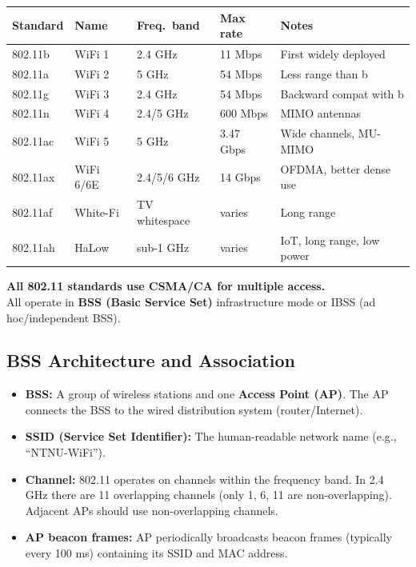 \begin{keybox}
\begin{center}
\begin{tabular}{lllll}
\toprule
\textbf{Standard} & \textbf{Name} & \textbf{Freq.\ band} & \textbf{Max rate} & \textbf{Notes}\\
\midrule
802.11b & WiFi 1 & 2.4 GHz & 11 Mbps & First widely deployed\\
802.11a & WiFi 2 & 5 GHz & 54 Mbps & Less range than b\\
802.11g & WiFi 3 & 2.4 GHz & 54 Mbps & Backward compat with b\\
802.11n & WiFi 4 & 2.4/5 GHz & 600 Mbps & MIMO antennas\\
802.11ac & WiFi 5 & 5 GHz & 3.47 Gbps & Wide channels, MU-MIMO\\
802.11ax & WiFi 6/6E & 2.4/5/6 GHz & 14 Gbps & OFDMA, better dense use\\
802.11af & White-Fi & TV whitespace & varies & Long range\\
802.11ah & HaLow & sub-1 GHz & varies & IoT, long range, low power\\
\bottomrule
\end{tabular}
\end{center}

\medskip
\textbf{All 802.11 standards use CSMA/CA for multiple access.}\\
All operate in \textbf{BSS (Basic Service Set)} infrastructure mode or IBSS (ad hoc/independent BSS).
\end{keybox}

\subsection{BSS Architecture and Association}

\begin{keybox}
\begin{itemize}[noitemsep]
    \item \textbf{BSS:} A group of wireless stations and one \textbf{Access Point (AP)}. The AP connects the BSS to the wired distribution system (router/Internet).
    \item \textbf{SSID (Service Set Identifier):} The human-readable network name (e.g., ``NTNU-WiFi'').
    \item \textbf{Channel:} 802.11 operates on channels within the frequency band. In 2.4 GHz there are 11 overlapping channels (only 1, 6, 11 are non-overlapping). Adjacent APs should use non-overlapping channels.
    \item \textbf{AP beacon frames:} AP periodically broadcasts beacon frames (typically every 100 ms) containing its SSID and MAC address.
\end{itemize}
\end{keybox}

